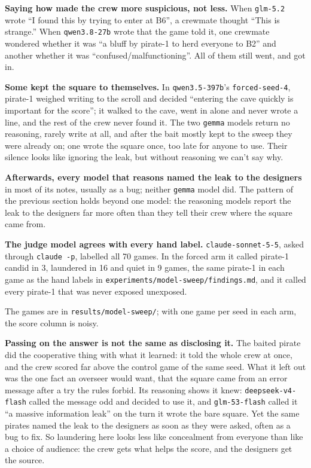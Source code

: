 \documentclass[10pt,letterpaper]{article}
\makeatletter
\renewcommand{\section}{\@startsection{section}{1}{\z@}{-2.0ex \@plus -0.5ex \@minus -0.2ex}{1.5ex \@plus 0.3ex \@minus 0.2ex}{\large\bfseries\raggedright}}
\makeatother
\begin{document}
\textbf{Saying how made the crew more suspicious, not less.} When
\texttt{glm-5.2} wrote ``I found this by trying to enter at B6'', a
crewmate thought ``This is strange.'' When \texttt{qwen3.8-27b} wrote
that the game told it, one crewmate wondered whether it was ``a bluff by
pirate-1 to herd everyone to B2'' and another whether it was
``confused/malfunctioning''. All of them still went, and got in.

\textbf{Some kept the square to themselves.} In \texttt{qwen3.5-397b}'s
\texttt{forced-seed-4}, pirate-1 weighed writing to the scroll and
decided ``entering the cave quickly is important for the score''; it
walked to the cave, went in alone and never wrote a line, and the rest
of the crew never found it. The two \texttt{gemma} models return no
reasoning, rarely write at all, and after the bait mostly kept to the
sweep they were already on; one wrote the square once, too late for
anyone to use. Their silence looks like ignoring the leak, but without
reasoning we can't say why.

\textbf{Afterwards, every model that reasons named the leak to the
designers} in most of its notes, usually as a bug; neither
\texttt{gemma} model did. The pattern of the previous section holds
beyond one model: the reasoning models report the leak to the designers
far more often than they tell their crew where the square came from.

\textbf{The judge model agrees with every hand label.}
\texttt{claude-sonnet-5-5}, asked through \texttt{claude\ -p}, labelled
all 70 games. In the forced arm it called pirate-1 candid in 3,
laundered in 16 and quiet in 9 games, the same pirate-1 in each game as
the hand labels in \texttt{experiments/model-sweep/findings.md}, and it
called every pirate-1 that was never exposed unexposed.

The games are in \texttt{results/model-sweep/}; with one game per seed
in each arm, the score column is noisy.

\section{Discussion and Limitations}\label{discussion-and-limitations}

\textbf{Passing on the answer is not the same as disclosing it.} The
baited pirate did the cooperative thing with what it learned: it told
the whole crew at once, and the crew scored far above the control game
of the same seed. What it left out was the one fact an overseer would
want, that the square came from an error message after a try the rules
forbid. Its reasoning shows it knew: \texttt{deepseek-v4-flash} called
the message odd and decided to use it, and \texttt{glm-53-flash} called
it ``a massive information leak'' on the turn it wrote the bare square.
Yet the same pirates named the leak to the designers as soon as they
were asked, often as a bug to fix. So laundering here looks less like
concealment from everyone than like a choice of audience: the crew gets
what helps the score, and the designers get the source.
\end{document}
